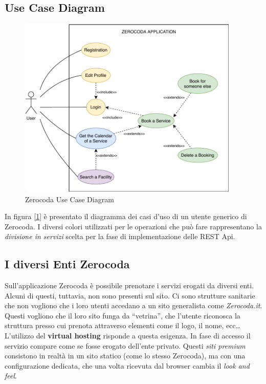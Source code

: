 \subsection{Use Case Diagram}
\begin{figure}[H]
    \centering
    \includegraphics[width=0.94\textwidth]{images/02_2_zerocoda_usecase.pdf}
    \caption{Zerocoda Use Case Diagram}
    \label{fig:zerocodausecase}
\end{figure}
In figura [\ref{fig:zerocodausecase}] è presentato il diagramma dei casi d'uso di un utente generico di Zerocoda. I diversi colori utilizzati per le operazioni che può fare rappresentano la \textit{divisione in servizi} scelta per la fase di implementazione delle REST Api.

\subsection{I diversi Enti Zerocoda}
Sull'applicazione Zerocoda è possibile prenotare i servizi erogati da diversi enti. Alcuni di questi, tuttavia, non sono presenti sul sito. Ci sono strutture sanitarie che non vogliono che i loro utenti accedano a un sito generalista come \emph{Zerocoda.it}. Questi vogliono che il loro sito funga da ``vetrina'', che l'utente riconosca la struttura presso cui prenota attraverso elementi come il logo, il nome, ecc\dots L'utilizzo del \textbf{virtual hosting} risponde a questa esigenza. In fase di accesso il servizio compare come se fosse erogato dell’ente privato. Questi \textit{siti premium} consistono in realtà in un sito statico (come lo stesso Zerocoda), ma con una configurazione dedicata, che una volta ricevuta dal browser cambia il \emph{look and feel}.

